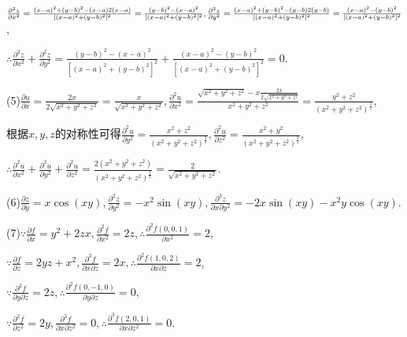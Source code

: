 \documentclass[12pt,UTF8]{ctexart}
\begin{document}
\begin{enumerate}
$\frac{\partial^2z}{\partial x^2}=\frac{(x-a)^2+(y-b)^2-(x-a)2(x-a)}{[(x-a)^2+(y-b)^2]^2}=\frac{(y-b)^2-(x-a)^2}{[(x-a)^2+(y-b)^2]^2},\\
\frac{\partial^2z}{\partial y^2}=\frac{(x-a)^2+(y-b)^2-(y-b)2(y-b)}{[(x-a)^2+(y-b)^2]^2}=\frac{(x-a)^2-(y-b)^2}{[(x-a)^2+(y-b)^2]^2}$,

$\therefore\frac{\partial^2z}{\partial x^2}+\frac{\partial^2z}{\partial y^2}=\frac{(y-b)^2-(x-a)^2}{[(x-a)^2+(y-b)^2]^2}+\frac{(x-a)^2-(y-b)^2}{[(x-a)^2+(y-b)^2]^2}=0$.

(5)$\frac{\partial u}{\partial x}=\frac{2x}{2\sqrt{x^2+y^2+z^2}}=\frac x{\sqrt{x^2+y^2+z^2}},\frac{\partial^2u}{\partial x^2}=\frac{\sqrt{x^2+y^2+z^2}-x\frac{2x}{2\sqrt{x^2+y^2+z^2}}}{x^2+y^2+z^2}=\frac{y^2+z^2}{(x^2+y^2+z^2)^{\frac32}}$,

根据$x,y,z$的对称性可得$\frac{\partial^2u}{\partial y^2}=\frac{x^2+z^2}{(x^2+y^2+z^2)^{\frac32}},\frac{\partial^2u}{\partial z^2}=\frac{x^2+y^2}{(x^2+y^2+z^2)^{\frac32}}$,

$\therefore\frac{\partial^2u}{\partial x^2}+\frac{\partial^2u}{\partial y^2}+\frac{\partial^2u}{\partial z^2}=\frac{2(x^2+y^2+z^2)}{(x^2+y^2+z^2)^{\frac32}}=\frac2{\sqrt{x^2+y^2+z^2}}$.

(6)$\frac{\partial z}{\partial y}=x\cos(xy),\frac{\partial^2z}{\partial y^2}=-x^2\sin(xy),\frac{\partial^3z}{\partial x\partial y^2}=-2x\sin(xy)-x^2y\cos(xy)$.

(7)$\because\frac{\partial f}{\partial x}=y^2+2zx,\frac{\partial^2f}{\partial x^2}=2z,\therefore\frac{\partial^2f(0,0,1)}{\partial x^2}=2$,

$\because\frac{\partial f}{\partial z}=2yz+x^2,\frac{\partial^2f}{\partial x\partial z}=2x,\therefore\frac{\partial^2f(1,0,2)}{\partial x\partial z}=2$,

$\because\frac{\partial^2f}{\partial y\partial z}=2z,\therefore\frac{\partial^2f(0,-1,0)}{\partial y\partial z}=0$,

$\because\frac{\partial^2f}{\partial z^2}=2y,\frac{\partial^3f}{\partial x\partial z^2}=0,\therefore\frac{\partial^3f(2,0,1)}{\partial x\partial z^2}=0$.
\end{enumerate}
\end{document}
